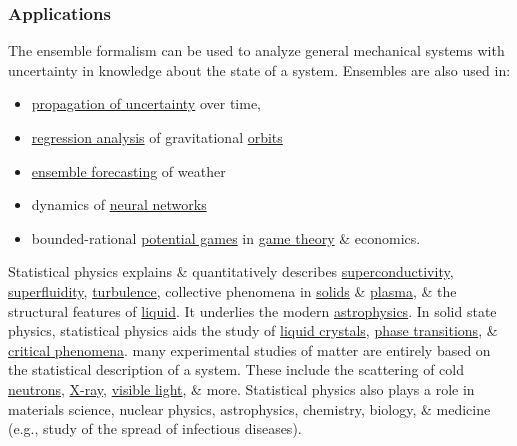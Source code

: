 \documentclass{article}
\begin{document}
\subsubsection{Applications}
The ensemble formalism can be used to analyze general mechanical systems with uncertainty in knowledge about the state of a system. Ensembles are also used in:
\begin{itemize}
	\item \href{https://en.wikipedia.org/wiki/Propagation_of_uncertainty}{propagation of uncertainty} over time,
	\item \href{https://en.wikipedia.org/wiki/Regression_analysis}{regression analysis} of gravitational \href{https://en.wikipedia.org/wiki/Orbit}{orbits}
	\item \href{https://en.wikipedia.org/wiki/Ensemble_forecasting}{ensemble forecasting} of weather
	\item dynamics of \href{https://en.wikipedia.org/wiki/Neural_networks}{neural networks}
	\item bounded-rational \href{https://en.wikipedia.org/wiki/Potential_game}{potential games} in \href{https://en.wikipedia.org/wiki/Game_theory}{game theory} \& economics.
\end{itemize}
Statistical physics explains \& quantitatively describes \href{https://en.wikipedia.org/wiki/Superconductivity}{superconductivity}, \href{https://en.wikipedia.org/wiki/Superfluidity}{superfluidity}, \href{https://en.wikipedia.org/wiki/Turbulence}{turbulence}, collective phenomena in \href{https://en.wikipedia.org/wiki/Solid}{solids} \& \href{https://en.wikipedia.org/wiki/Plasma_(physics)}{plasma}, \& the structural features of \href{https://en.wikipedia.org/wiki/Liquid}{liquid}. It underlies the modern \href{https://en.wikipedia.org/wiki/Astrophysics}{astrophysics}. In solid state physics, statistical physics aids the study of \href{https://en.wikipedia.org/wiki/Liquid_crystals}{liquid crystals}, \href{https://en.wikipedia.org/wiki/Phase_transition}{phase transitions}, \& \href{https://en.wikipedia.org/wiki/Critical_phenomena}{critical phenomena}. many experimental studies of matter are entirely based on the statistical description of a system. These include the scattering of cold \href{https://en.wikipedia.org/wiki/Neutron}{neutrons}, \href{https://en.wikipedia.org/wiki/X-ray}{X-ray}, \href{https://en.wikipedia.org/wiki/Visible_radiation}{visible light}, \& more. Statistical physics also plays a role in materials science, nuclear physics, astrophysics, chemistry, biology, \& medicine (e.g., study of the spread of infectious diseases).
\end{document}
